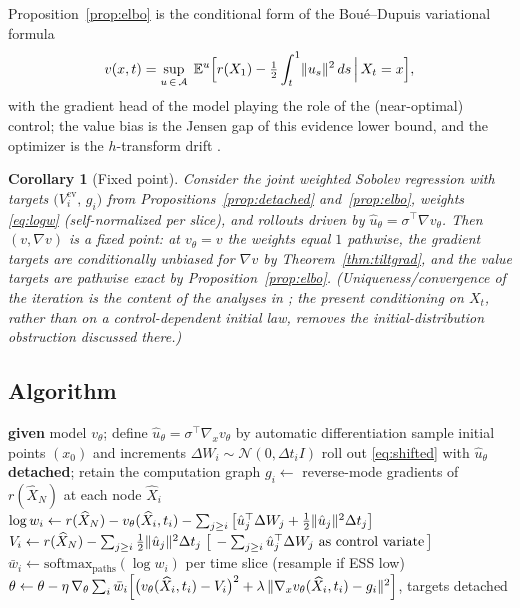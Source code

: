 \documentclass[11pt]{article}
\newtheorem{corollary}[theorem]{Corollary}
\theoremstyle{definition}
\theoremstyle{remark}
\newcommand{\E}{\mathbb{E}}
\newcommand{\grad}{\nabla}
\newcommand{\uhat}{\hat{u}}
\DeclarePairedDelimiter{\norm}{\lVert}{\rVert}
\begin{document}
Proposition~\ref{prop:elbo} is the conditional form of the Bou\'e--Dupuis variational formula
\cite{BoueDupuis}
\[
v(x,t) = \sup_{u\,\in\,\mathcal A}\;
\E^{u}\Big[r(X_1) - \tfrac12\int_t^1 \norm{u_s}^2\,ds \,\Big|\, X_t = x\Big],
\]
with the gradient head of the model playing the role of the (near-optimal) control; the value
bias is the Jensen gap of this evidence lower bound, and the optimizer is the $h$-transform
drift \cite{DaiPra,FlemingSoner}.

\begin{corollary}[Fixed point]\label{cor:fixed}
Consider the joint weighted Sobolev regression with targets
$\big(V_i^{\mathrm{cv}},\,g_i\big)$ from Propositions~\ref{prop:detached}
and~\ref{prop:elbo}, weights \eqref{eq:logw} (self-normalized per slice), and rollouts driven
by $\uhat_\theta = \sigma^\top\grad v_\theta$. Then $(v,\grad v)$ is a fixed point: at
$v_\theta = v$ the weights equal $1$ pathwise, the gradient targets are conditionally
unbiased for $\grad v$ by Theorem~\ref{thm:tiltgrad}, and the value targets are pathwise
exact by Proposition~\ref{prop:elbo}. (Uniqueness/convergence of the iteration is the
content of the analyses in \cite{AdjointMatching,SOCM}; the present conditioning on $X_t$,
rather than on a control-dependent initial law, removes the initial-distribution
obstruction discussed there.)
\end{corollary}

\subsection{Algorithm}

\begin{algorithm}[h]
\caption{Tangent-target regression for $v(x,t)=\log\E[e^{r(X_1)}\mid X_t=x]$}
\begin{algorithmic}[1]
\State \textbf{given} model $v_\theta$; define
$\uhat_\theta = \sigma^\top \grad_x v_\theta$ by automatic differentiation
\Loop
\State sample initial points $(x_0)$ and increments $\Delta W_i \sim \mathcal N(0,\Delta t_i I)$
\State roll out \eqref{eq:shifted} with $\uhat_\theta$ \textbf{detached};
retain the computation graph
\State $g_i \gets$ reverse-mode gradients of $r(\widehat X_N)$ at each node $\widehat X_i$
\State $\log w_i \gets r(\widehat X_N) - v_\theta(\widehat X_i,t_i)
- \sum_{j\ge i}\big[\uhat_j^\top \Delta W_j + \tfrac12\norm{\uhat_j}^2\Delta t_j\big]$
\State $V_i \gets r(\widehat X_N) - \sum_{j\ge i}\tfrac12\norm{\uhat_j}^2\Delta t_j
\;\big[\, -\sum_{j\ge i}\uhat_j^\top\Delta W_j \text{ as control variate}\,\big]$
\State $\bar w_i \gets \mathrm{softmax}_{\text{paths}}(\log w_i)$ per time slice
(resample if ESS low)
\State $\theta \gets \theta - \eta\,\grad_\theta \sum_i \bar w_i\Big[
\big(v_\theta(\widehat X_i,t_i)-V_i\big)^2
+ \lambda\,\norm{\grad_x v_\theta(\widehat X_i,t_i)-g_i}^2\Big]$,
targets detached
\EndLoop
\end{algorithmic}
\end{algorithm}
\end{document}

